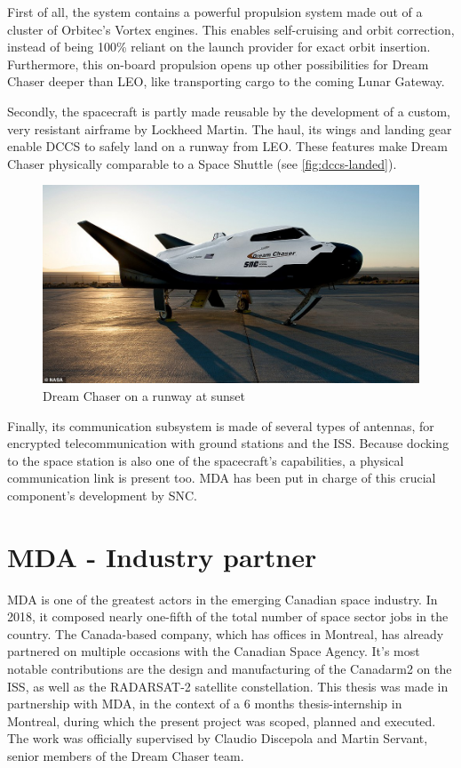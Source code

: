 First of all, the system contains a powerful propulsion system made out of a cluster of Orbitec's Vortex engines\cite{online:messier}. This enables self-cruising and orbit correction, instead of being 100\% reliant on the launch provider for exact orbit insertion. Furthermore, this on-board propulsion opens up other possibilities for Dream Chaser deeper than \gls{LEO}, like transporting cargo to the coming Lunar Gateway\cite{online:foust}.

Secondly, the  spacecraft is partly made reusable by the development of a custom, very resistant airframe by Lockheed Martin. The haul, its wings and landing gear enable \gls{DCCS} to safely land on a runway from \gls{LEO}. These features make Dream Chaser physically comparable to a Space Shuttle (see \autoref{fig:dccs-landed}). 
\begin{figure}[H]
	\centering
	\includegraphics[width=0.9\linewidth, keepaspectratio]{art/dream-chaser-landed.jpg}
	\caption{Dream Chaser on a runway at sunset \cite{misc:dccs-landed}}
	\label{fig:dccs-landed}
\end{figure}
Finally, its communication subsystem is made of several types of antennas, for encrypted telecommunication with ground stations and the \gls{ISS}. Because docking to the space station is also one of the spacecraft's capabilities, a physical communication link is present too. \gls{MDA} has been put in charge of this crucial component's development by \gls{SNC}. 

\section{MDA - Industry partner}
\gls{MDA} is one of the greatest actors in the emerging Canadian space industry. In 2018, it composed nearly one-fifth of the total number of space sector jobs in the country\cite{online:mda-front-page}\cite{misc:canada-space-industry-report}. The Canada-based company, which has offices in Montreal, has already partnered on multiple occasions with the Canadian Space Agency. It's most notable contributions are the design and manufacturing of the Canadarm2 on the \gls{ISS}, as well as the RADARSAT-2 satellite constellation. This thesis was made in partnership with \gls{MDA}, in the context of a 6 months thesis-internship in Montreal, during which the present project was scoped, planned and executed. The work was officially supervised by Claudio Discepola and Martin Servant, senior members of the Dream Chaser team. 

